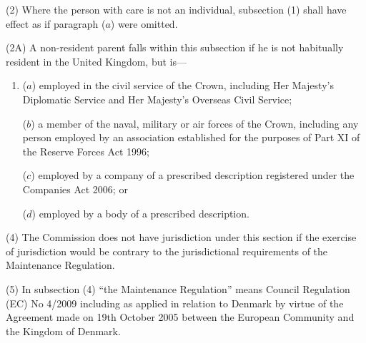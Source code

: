 \documentclass[a4paper]{article}
\begin{document}
(2) Where the person with care is not an individual, subsection (1) shall have effect as if paragraph ($a$) were omitted.

(2A) A non-resident parent falls within this subsection if he is not habitually resident in the United Kingdom, but is---
\begin{enumerate}\item[]
($a$) employed in the civil service of the Crown, including Her Majesty’s
Diplomatic Service and Her Majesty’s Overseas Civil Service;

($b$) a member of the naval, military or air forces of the Crown, including any
person employed by an association established for the purposes of Part XI of
the Reserve Forces Act 1996;

($c$) employed by a company of a prescribed description registered under the
Companies Act 2006; or

($d$) employed by a body of a prescribed description.
\end{enumerate}


(4) The Commission does not have jurisdiction under this section if the exercise of jurisdiction would be contrary to the jurisdictional requirements of the Maintenance Regulation.

(5) In subsection (4) “the Maintenance Regulation” means Council Regulation (EC) No 4/2009 including as applied in relation to Denmark by virtue of the Agreement made on 19th October 2005 between the European Community and the Kingdom of Denmark.
\end{document}
